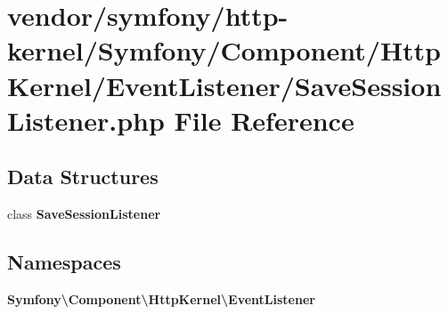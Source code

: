 \section{vendor/symfony/http-\/kernel/\+Symfony/\+Component/\+Http\+Kernel/\+Event\+Listener/\+Save\+Session\+Listener.php File Reference}
\label{_save_session_listener_8php}
\subsection*{Data Structures}
\begin{DoxyCompactItemize}
\item 
class {\bf Save\+Session\+Listener}
\end{DoxyCompactItemize}
\subsection*{Namespaces}
\begin{DoxyCompactItemize}
\item 
 {\bf Symfony\textbackslash{}\+Component\textbackslash{}\+Http\+Kernel\textbackslash{}\+Event\+Listener}
\end{DoxyCompactItemize}
